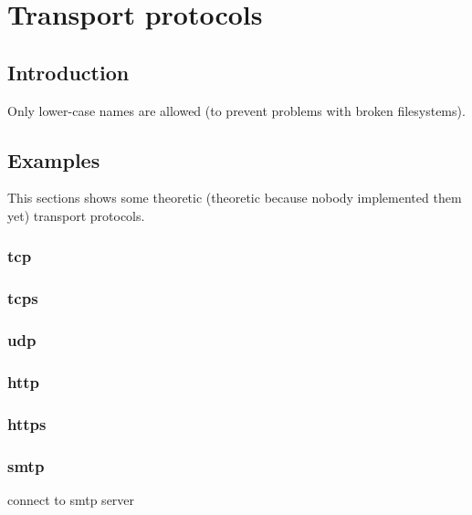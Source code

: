 \documentclass[12pt,a4paper]{book}
\begin{document}
\chapter{Transport protocols}
\section{Introduction}
Only lower-case names are allowed (to prevent problems with broken filesystems).
\section{Examples}
This sections shows some theoretic (theoretic because nobody implemented
them yet) transport protocols.
\subsection{tcp}
\subsection{tcps}
\subsection{udp}
\subsection{http}
\subsection{https}
\subsection{smtp}
connect to smtp server
\end{document}
